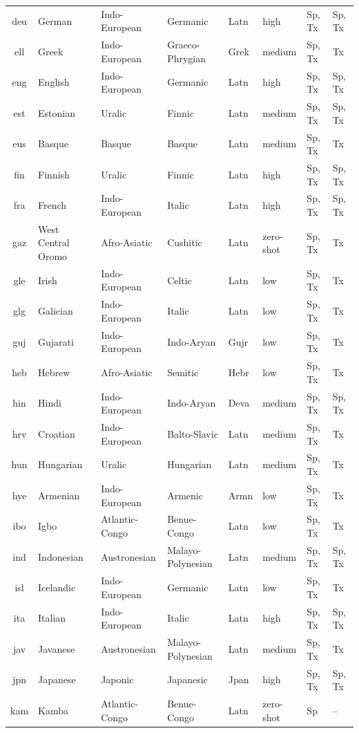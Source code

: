 \begin{table}[!p]
\begin{tabular}{clllllll}
deu & German & Indo-European & Germanic & Latn & high & Sp, Tx & Sp, Tx \\
ell & Greek & Indo-European & Graeco-Phrygian & Grek & medium & Sp, Tx & Tx \\
eng & English & Indo-European & Germanic & Latn & high & Sp, Tx & Sp, Tx \\
est & Estonian & Uralic & Finnic & Latn & medium & Sp, Tx & Sp, Tx \\
eus & Basque & Basque & Basque & Latn & medium & Sp, Tx & Tx \\
fin & Finnish & Uralic & Finnic & Latn & high & Sp, Tx & Sp, Tx \\
fra & French & Indo-European & Italic & Latn & high & Sp, Tx & Sp, Tx \\
gaz & West Central Oromo & Afro-Asiatic & Cushitic & Latn & zero-shot & Sp, Tx & Tx \\
gle & Irish & Indo-European & Celtic & Latn & low & Sp, Tx & Tx \\
glg & Galician & Indo-European & Italic & Latn & low & Sp, Tx & Tx \\
guj & Gujarati & Indo-European & Indo-Aryan & Gujr & low & Sp, Tx & Tx \\
heb & Hebrew & Afro-Asiatic & Semitic & Hebr & low & Sp, Tx & Tx \\
hin & Hindi & Indo-European & Indo-Aryan & Deva & medium & Sp, Tx & Sp, Tx \\
hrv & Croatian & Indo-European & Balto-Slavic & Latn & medium & Sp, Tx & Tx \\
hun & Hungarian & Uralic & Hungarian & Latn & medium & Sp, Tx & Tx \\
hye & Armenian & Indo-European & Armenic & Armn & low & Sp, Tx & Tx \\
ibo & Igbo & Atlantic-Congo & Benue-Congo & Latn & low & Sp, Tx & Tx \\
ind & Indonesian & Austronesian & Malayo-Polynesian & Latn & medium & Sp, Tx & Sp, Tx \\
isl & Icelandic & Indo-European & Germanic & Latn & low & Sp, Tx & Tx \\
ita & Italian & Indo-European & Italic & Latn & high & Sp, Tx & Sp, Tx \\
jav & Javanese & Austronesian & Malayo-Polynesian & Latn & medium & Sp, Tx & Tx \\
jpn & Japanese & Japonic & Japanesic & Jpan & high & Sp, Tx & Sp, Tx \\
kam & Kamba & Atlantic-Congo & Benue-Congo & Latn & zero-shot & Sp & -- \\

\end{tabular}
\end{table}
